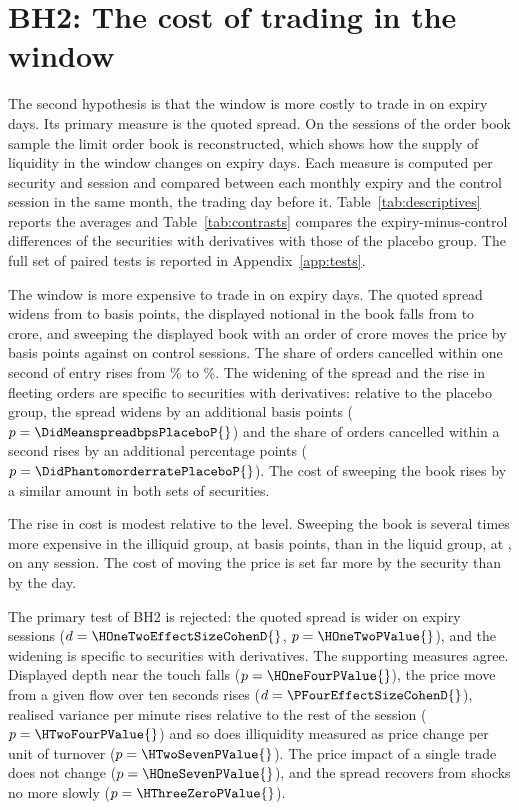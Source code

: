 \section{BH2: The cost of trading in the window}\label{sec:bh2}\label{sec:book}

The second hypothesis is that the window is more costly to trade in on expiry days. Its primary
measure is the quoted spread. 
On the \DesignSessions{} sessions of the order book sample the limit order book is
reconstructed, which shows how the supply of liquidity in the window changes on expiry days.
Each measure is computed per security and session and compared between each monthly expiry
and the control session in the same month, the trading day before it.
Table~\ref{tab:descriptives} reports the averages and Table~\ref{tab:contrasts} compares the
expiry-minus-control differences of the securities with derivatives with those of the
placebo group. The full set of paired tests is reported in Appendix~\ref{app:tests}.



The window is more expensive to trade in on expiry days. The quoted spread widens from
\SpreadMeanBpsControl{} to \SpreadMeanBpsExpiry{} basis points, the displayed notional in the
book falls from \BookVisibleCrControl{} to \BookVisibleCrExpiry{} crore, and sweeping the
displayed book with an order of \ProbeSizeCr{} crore moves the price by
\MoveBpsSmallExpiry{} basis points against \MoveBpsSmallControl{} on control sessions. The share
of orders cancelled within one second of entry rises from \LifePhantomRateControl{}\% to
\LifePhantomRateExpiry{}\%. The widening of the spread and the rise in fleeting orders are
specific to securities with derivatives: relative to the placebo group, the spread widens by an
additional \DidMeanspreadbpsPlacebo{} basis points ($p = \DidMeanspreadbpsPlaceboP{}$) and the
share of orders cancelled within a second rises by an additional
\DidPhantomorderratePlaceboPp{} percentage points ($p = \DidPhantomorderratePlaceboP{}$). The
cost of sweeping the book rises by a similar amount in both sets of securities.

The rise in cost is modest relative to the level. Sweeping the book is several times more
expensive in the illiquid group, at \MoveBpsSmallIlliquid{} basis points, than in the liquid
group, at \MoveBpsSmallLiquid{}, on any session. The cost of moving the price is set far more by
the security than by the day.


The primary test of BH2 is rejected: the quoted spread is wider on expiry sessions
($d = \HOneTwoEffectSizeCohenD{}$, $p = \HOneTwoPValue{}$), and the widening is specific to
securities with derivatives. The supporting measures agree. Displayed depth near the touch
falls ($p = \HOneFourPValue{}$), the price move from a given flow over ten seconds rises
($d = \PFourEffectSizeCohenD{}$), realised variance per minute rises relative to the rest of the
session ($p = \HTwoFourPValue{}$) and so does illiquidity measured as price change per unit of
turnover ($p = \HTwoSevenPValue{}$). The price impact of a single trade does not change
($p = \HOneSevenPValue{}$), and the spread recovers from shocks no more slowly
($p = \HThreeZeroPValue{}$).


